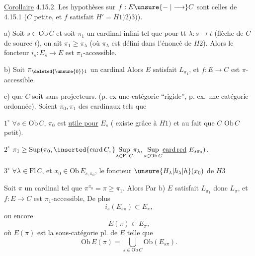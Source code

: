 \uline{Corollaire} 4.15.2. Les hypothèses sur $f:E\unsure{\relbar|\longrightarrow}C$ sont celles de 4.15.1 ($C$ petite, et $f$ satisfait $H'=H1)2)3)$).


a) Soit $s\in\mathrm{Ob}\,C$ et soit $\pi_1$ un cardinal infini tel que pour tt $\lambda:s\to t$ (flèche de $C$ de source $t$), on ait $\pi_1\geq\pi_\lambda$ (où $\pi_\lambda$ est défini dans l'énoncé de $H2$). Alors le foncteur $i_s:E_s\longrightarrow E$  est $\pi_1$-accessible.

b)  Soit $\pi_{\deleted{\unsure{0}}1}$ un cardinal   Alors $E$ satisfait $L_{\pi_1}$, et $f:E\to C$ est $\pi$-accessible.

c)   que $C$ soit sans projecteurs. (p. ex une catégorie ``rigide'', p. ex. une catégorie ordonnée). Soient $\pi_0,\pi_1$ des cardinaux tels que

\textcircled{\scriptsize $1^\circ$}  $\forall s\in\mathrm{Ob}\,C$, $\pi_0$ est \uline{utile pour} $E_s$ ( existe grâce à $H1)$ et au fait que $C$  $\mathrm{Ob}\,C$ petit).

\textcircled{\scriptsize $2^\circ$} $\pi_1\geq\mathrm{Sup}(\pi_0,\inserted{\mathrm{card}\,C,}\underset{\lambda\in\mathrm{Fl}\,C}{\mathrm{Sup}}\pi_\lambda,\underset{s\in\mathrm{Ob}\,C}{\mathrm{Sup}}\underline{\mathrm{card\,red}}\ E_{s\pi_0})$.

\textcircled{\scriptsize $3^\circ$} $\forall\lambda\in\mathrm{Fl}\,C$, et $x_0\in\mathrm{Ob}\,E_{s,\pi_0}$, le foncteur $\unsure{H_\lambda|h_\lambda|h} (x_0)$ de $H3$ 

Soit $\pi$  un cardinal tel que $\pi^{\pi_0}=\pi\geq\pi_1$. Alors Par b) $E$ satisfait $L_{\pi_1}$ donc $L_\pi$, et $f:E\to C$ est $\pi_1$-accessible, De plus
\[i_s(E_{s\pi})\subset E_\pi,\]
 ou encore  
\[E(\pi)\subset E_\pi,\]
où $E(\pi)$ est la sous-catégorie pl. de $E$  telle que
\[\mathrm{Ob}\,E(\pi)=\bigcup_{s\in\mathrm{Ob}\,C}\mathrm{Ob}(E_{s\pi}).\]

